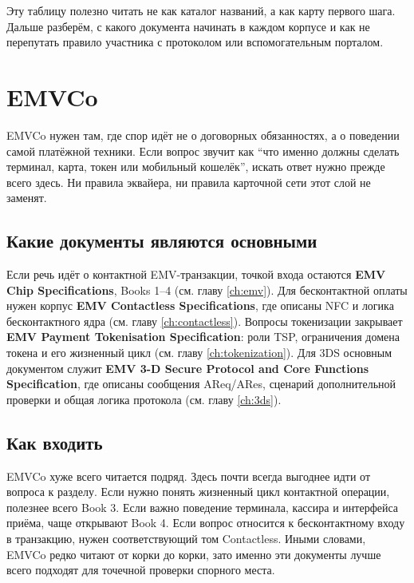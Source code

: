 Эту таблицу полезно читать не как каталог названий, а как карту
первого шага. Дальше разберём, с какого документа начинать в каждом
корпусе и как не перепутать правило участника с протоколом
или вспомогательным порталом.

\section{EMVCo}
\label{sec:ps-emvco}

EMVCo нужен там, где спор идёт не о договорных обязанностях,
а о поведении самой платёжной техники. Если вопрос звучит как
\enquote{что именно должны сделать терминал, карта, токен
или мобильный кошелёк}, искать ответ нужно прежде всего здесь.
Ни правила эквайера, ни правила карточной сети этот слой
не заменят.

\subsection*{Какие документы являются основными}

Если речь идёт о контактной EMV-транзакции, точкой входа остаются
\textbf{EMV Chip Specifications}, Books 1--4
(см. главу \ref{ch:emv}). Для бесконтактной оплаты нужен корпус
\textbf{EMV Contactless Specifications}, где описаны NFC
и логика бесконтактного ядра
(см. главу \ref{ch:contactless}). Вопросы токенизации закрывает
\textbf{EMV Payment Tokenisation Specification}: роли TSP,
ограничения домена токена и его жизненный цикл
(см. главу \ref{ch:tokenization}). Для 3DS основным документом
служит \textbf{EMV 3-D Secure Protocol and Core Functions
Specification}, где описаны сообщения AReq/ARes, сценарий
дополнительной проверки и общая логика протокола
(см. главу \ref{ch:3ds}).

\subsection*{Как входить}

EMVCo хуже всего читается подряд. Здесь почти всегда выгоднее идти
от вопроса к разделу. Если нужно понять жизненный цикл контактной
операции, полезнее всего Book 3. Если важно поведение терминала,
кассира и интерфейса приёма, чаще открывают Book 4. Если вопрос
относится к бесконтактному входу в транзакцию, нужен соответствующий
том Contactless. Иными словами, EMVCo редко читают от корки
до корки, зато именно эти документы лучше всего подходят
для точечной проверки спорного места.

